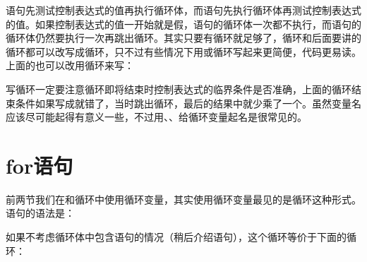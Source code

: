 \begin{BookLiteral}
\end{BookLiteral}


语句先测试控制表达式的值再执行循环体，而语句先执行循环体再测试控制表达式的值。如果控制表达式的值一开始就是假，语句的循环体一次都不执行，而语句的循环体仍然要执行一次再跳出循环。其实只要有循环就足够了，循环和后面要讲的循环都可以改写成循环，只不过有些情况下用或循环写起来更简便，代码更易读。上面的也可以改用循环来写：




写循环一定要注意循环即将结束时控制表达式的临界条件是否准确，上面的循环结束条件如果写成就错了，当时跳出循环，最后的结果中就少乘了一个。虽然变量名应该尽可能起得有意义一些，不过用、、给循环变量起名是很常见的。




\section{for语句}
%
前两节我们在和循环中使用循环变量，其实使用循环变量最见的是循环这种形式。语句的语法是：


\begin{BookLiteral}
\end{BookLiteral}


如果不考虑循环体中包含语句的情况（稍后介绍语句），这个循环等价于下面的循环：





